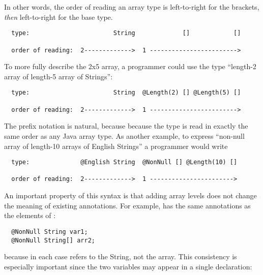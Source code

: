 \documentclass[10pt]{article}
\begin{document}
In other words, the order of reading an array type is left-to-right for the
brackets, \emph{then} left-to-right for the base type.

\begin{Verbatim}
  type:                       String             []            []

  order of reading:  2------------->  1 ------------------------>
\end{Verbatim}



To more fully describe the 2x5 array, a programmer could use the
type ``length-2 array of length-5 array of Strings'':

\begin{Verbatim}
  type:                       String  @Length(2) [] @Length(5) []

  order of reading:  2------------->  1 ------------------------>
\end{Verbatim}

The prefix notation is natural, because because the type is read in exactly
the same order as any Java array type.  As another example, to express
``non-null array of length-10 arrays of English Strings'' a programmer
would write

\begin{Verbatim}
  type:              @English String  @NonNull [] @Length(10) []

  order of reading:  2------------->  1 ----------------------->
\end{Verbatim}




An important property of this syntax is that adding array levels does not
change the meaning of existing annotations.  For example,  has
the same annotations as the elements of :

\begin{Verbatim}
  @NonNull String var1;
  @NonNull String[] arr2;
\end{Verbatim}

\noindent
because in each case  refers to the String, not the array.
This consistency is especially important since the two variables may appear in a single
declaration:
\end{document}

